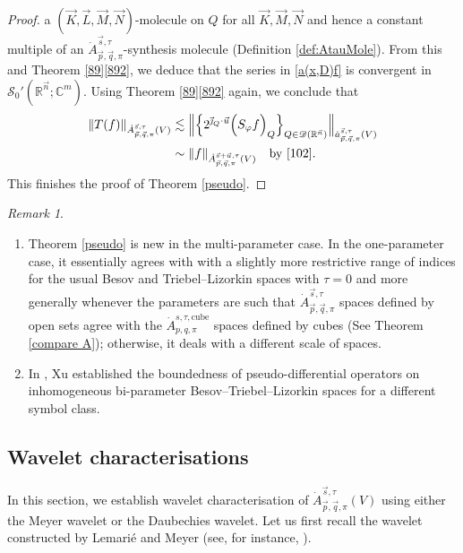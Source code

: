 \documentclass[11pt, reqno]{amsart}
\theoremstyle{definition}
\theoremstyle{remark}
\newtheorem{remark}[theorem]{Remark}
\numberwithin{equation}{section}
\newcommand{\C}{\mathbb C}
\newcommand{\vj}{\vec{\textit{\j}}}
\newcommand{\vp}{\vec p}
\newcommand{\vq}{\vec q}
\newcommand{\vs}{\vec s}
\newcommand{\vu}{\vec u}
\newcommand{\Atau}{\dot A^{\vs,\tau}_{\vp,\vq,\pi}}
\newcommand{\AtauCube}{\dot A^{s,\tau,\mathrm{cube}}_{p,q,\pi}}
\begin{document}
\begin{proof}
a $(\vec K,\vec L,\vec M,\vec N)$-molecule on $Q$ for all $\vec K,\vec M,\vec N$
and hence a constant multiple of an $\dot A^{\vec s,\tau}_{\vec p,\vec q,\pi}$-synthesis molecule (Definition \ref{def:AtauMole}).
From this and Theorem \ref{89}\eqref{892}, we deduce that
the series in \eqref{a(x,D)f} is convergent in $\mathscr{S}_0'(\mathbb R^{\vec n};\C^m)$.
Using Theorem \ref{89}\eqref{892} again, we conclude that
\begin{equation*}
\begin{split}
\|T(f)\|_{\dot A_{\vp,\vq,\pi}^{\vs,\tau}(V)}
&\lesssim\Big\|\Big\{ 2^{\vj_Q \cdot \vu} \Big(S_\varphi f\Big)_Q
\Big\}_{Q\in\mathscr{D}(\mathbb R^{\vec n})}\Big\|_{\dot a_{\vp,\vq,\pi}^{\vs,\tau}(V)}\\
&\sim \|f\|_{\dot A_{\vp,\vq,\pi}^{\vs+\vu,\tau}(V)}\quad\text{by \eqref{102}}.
\end{split}
\end{equation*}
This finishes the proof of Theorem \ref{pseudo}.
\end{proof}

\begin{remark}
\begin{enumerate}[{\rm (i)}]
\item Theorem \ref{pseudo} is new in the multi-parameter case. In the one-parameter case, it essentially agrees with \cite[Theorem 3.23]{BHYY:1c} with a slightly more restrictive range of indices for the usual Besov and Triebel--Lizorkin spaces with $\tau=0$ and more generally whenever the parameters are such that $\Atau$ spaces defined by open sets agree with the $\AtauCube$ spaces defined by cubes (See Theorem \ref{compare A}); otherwise, it deals with a different scale of spaces.

\item In \cite{Xu22}, Xu established the boundedness of
pseudo-differential operators on inhomogeneous bi-parameter
Besov--Triebel--Lizorkin spaces for a different symbol class.
\end{enumerate}
\end{remark}

\subsection{Wavelet characterisations}
\label{wavelet characterization}

In this section, we establish wavelet characterisation of
$\Atau(V)$ using either the Meyer wavelet or the Daubechies wavelet.
Let us first recall the wavelet constructed by Lemari\'e and Meyer
(see, for instance, \cite[Theorem 2]{lm86}).
\end{document}

